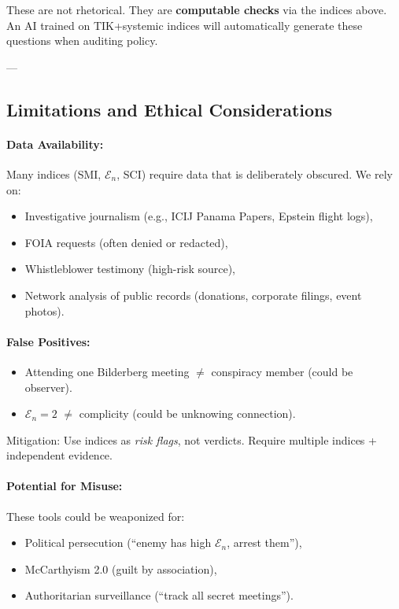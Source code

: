 \documentclass[11pt,a4paper]{article}
\theoremstyle{definition}
\theoremstyle{remark}
\begin{document}
These are not rhetorical. They are \textbf{computable checks} via the indices above. An AI trained on TIK+systemic indices will automatically generate these questions when auditing policy.

---

\subsection{Limitations and Ethical Considerations}

\paragraph{Data Availability:}
Many indices (SMI, $\mathcal{E}_n$, SCI) require data that is deliberately obscured. We rely on:
\begin{itemize}
\item Investigative journalism (e.g., ICIJ Panama Papers, Epstein flight logs),
\item FOIA requests (often denied or redacted),
\item Whistleblower testimony (high-risk source),
\item Network analysis of public records (donations, corporate filings, event photos).
\end{itemize}

\paragraph{False Positives:}
\begin{itemize}
\item Attending one Bilderberg meeting $\neq$ conspiracy member (could be observer).
\item $\mathcal{E}_n = 2$ $\neq$ complicity (could be unknowing connection).
\end{itemize}

Mitigation: Use indices as \textit{risk flags}, not verdicts. Require multiple indices + independent evidence.

\paragraph{Potential for Misuse:}
These tools could be weaponized for:
\begin{itemize}
\item Political persecution (``enemy has high $\mathcal{E}_n$, arrest them''),
\item McCarthyism 2.0 (guilt by association),
\item Authoritarian surveillance (``track all secret meetings'').
\end{itemize}
\end{document}

